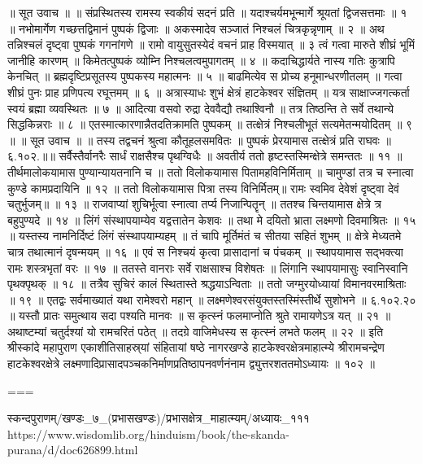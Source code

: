 ॥ सूत उवाच ॥ ॥
संप्रस्थितस्य रामस्य स्वकीयं सदनं प्रति ॥
यदाश्चर्यमभून्मार्गे श्रूयतां द्विजसत्तमाः ॥ १ ॥
नभोमार्गेण गच्छत्तद्विमानं पुष्पकं द्विजाः ॥
अकस्मादेव सञ्जातं निश्चलं चित्रकृन्नृणाम् ॥ २ ॥
अथ तन्निश्चलं दृष्ट्वा पुष्पकं गगनांगणे ॥
रामो वायुसुतस्येदं वचनं प्राह विस्मयात् ॥ ३
त्वं गत्वा मारुते शीघ्रं भूमिं जानीहि कारणम् ॥
किमेतत्पुष्पकं व्योम्नि निश्चलत्वमुपागतम् ॥ ४ ॥
कदाचिद्धार्यते नास्य गतिः कुत्रापि केनचित् ॥
ब्रह्मदृष्टिप्रसूतस्य पुष्पकस्य महात्मनः ॥ ५ ॥
बाढमित्येव स प्रोच्य हनूमान्धरणीतलम् ॥
गत्वा शीघ्रं पुनः प्राह प्रणिपत्य रघूत्तमम् ॥ ६ ॥
अत्रास्याधः शुभं क्षेत्रं हाटकेश्वर संज्ञितम् ॥
यत्र साक्षाज्जगत्कर्ता स्वयं ब्रह्मा व्यवस्थितः ॥ ७ ॥
आदित्या वसवो रुद्रा देववैद्यौ तथाश्विनौ ॥
तत्र तिष्ठन्ति ते सर्वे तथान्ये सिद्धकिन्नराः ॥ ८ ॥
एतस्मात्कारणान्नैतदतिक्रामति पुष्पकम् ॥
तत्क्षेत्रं निश्चलीभूतं सत्यमेतन्मयोदितम् ॥ ९ ॥
॥ सूत उवाच ॥ ॥
तस्य तद्वचनं श्रुत्वा कौतूहलसमवितः ॥
पुष्पकं प्रेरयामास तत्क्षेत्रं प्रति राघवः ॥६.१०२.॥॥
सर्वैस्तैर्वानरैः सार्धं राक्षसैश्च पृथग्विधैः ॥
अवतीर्य ततो हृष्टस्तस्मिन्क्षेत्रे समन्ततः ॥ ११ ॥
तीर्थमालोकयामास पुण्यान्यायतनानि च ॥
ततो विलोकयामास पितामहविनिर्मिताम् ॥
चामुण्डां तत्र च स्नात्वा कुण्डे कामप्रदायिनि ॥ १२ ॥
ततो विलोकयामास पित्रा तस्य विनिर्मितम्॥
रामः स्वमिव देवेशं दृष्ट्वा देवं चतुर्भुजम्॥ ॥ १३ ॥
राजवाप्यां शुचिर्भूत्वा स्नात्वा तर्प्य निजान्पितॄन् ॥
ततश्च चिन्तयामास क्षेत्रे त्र बहुपुण्यदे ॥ १४ ॥
लिंगं संस्थापयाम्येव यद्वत्तातेन केशवः ॥
तथा मे दयितो भ्राता लक्ष्मणो दिवमाश्रितः ॥ १५ ॥
यस्तस्य नामनिर्दिष्टं लिंगं संस्थापयाम्यहम् ॥
तं चापि मूर्तिमंतं च सीतया सहितं शुभम् ॥
क्षेत्रे मेध्यतमे चात्र तथात्मानं दृषन्मयम् ॥ १६ ॥
एवं स निश्चयं कृत्वा प्रासादानां च पंचकम् ॥
स्थापयामास सद्भक्त्या रामः शस्त्रभृतां वरः ॥ १७ ॥
ततस्ते वानराः सर्वे राक्षसाश्च विशेषतः ॥
लिंगानि स्थापयामासुः स्वानिस्वानि पृथक्पृथक् ॥ १८ ॥
तत्रैव सुचिरं कालं स्थितास्ते श्रद्धयाऽन्विताः ॥
ततो जग्मुरयोध्यायां विमानवरमाश्रिताः ॥ १९ ॥
एतद्वः सर्वमाख्यातं यथा रामेश्वरो महान् ॥
लक्ष्मणेश्वरसंयुक्तस्तस्मिंस्तीर्थे सुशोभने ॥ ६.१०२.२० ॥
यस्तौ प्रातः समुत्थाय सदा पश्यति मानवः ॥
स कृत्स्नं फलमाप्नोति श्रुते रामायणेऽत्र यत् ॥ २१ ॥
अथाष्टम्यां चतुर्दश्यां यो रामचरितं पठेत् ॥
तदग्रे वाजिमेधस्य स कृत्स्नं लभते फलम् ॥ २२ ॥
इति श्रीस्कांदे महापुराण एकाशीतिसाहस्र्यां संहितायां षष्ठे नागरखण्डे हाटकेश्वरक्षेत्रमाहात्म्ये श्रीरामचन्द्रेण हाटकेश्वरक्षेत्रे लक्ष्मणादिप्रासादपञ्चकनिर्माणप्रतिष्ठापनवर्णनंनाम द्व्युत्तरशततमोऽध्यायः ॥ १०२ ॥

===

स्कन्दपुराणम्/खण्डः_७_(प्रभासखण्डः)/प्रभासक्षेत्र_माहात्म्यम्/अध्यायः_१११
https://www.wisdomlib.org/hinduism/book/the-skanda-purana/d/doc626899.html

